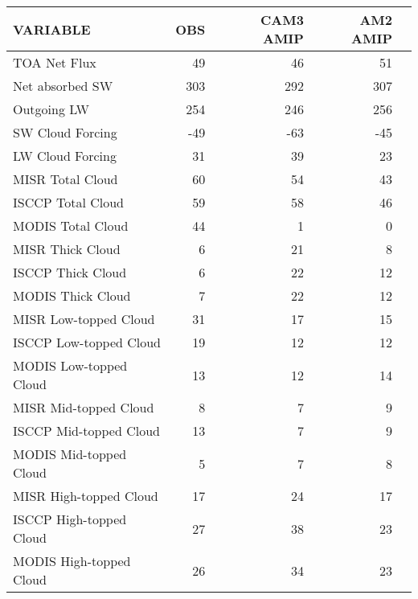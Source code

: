 \begin{tabular}{lrrrr}
\hline
                VARIABLE &                      OBS &                CAM3 AMIP &                 AM2 AMIP \\ \hline
            TOA Net Flux &                       49 &                       46 &                       51 \\
         Net absorbed SW &                      303 &                      292 &                      307 \\
             Outgoing LW &                      254 &                      246 &                      256 \\
        SW Cloud Forcing &                      -49 &                      -63 &                      -45 \\
        LW Cloud Forcing &                       31 &                       39 &                       23 \\
        MISR Total Cloud &                       60 &                       54 &                       43 \\
       ISCCP Total Cloud &                       59 &                       58 &                       46 \\
       MODIS Total Cloud &                       44 &                        1 &                        0 \\
        MISR Thick Cloud &                        6 &                       21 &                        8 \\
       ISCCP Thick Cloud &                        6 &                       22 &                       12 \\
       MODIS Thick Cloud &                        7 &                       22 &                       12 \\
   MISR Low-topped Cloud &                       31 &                       17 &                       15 \\
  ISCCP Low-topped Cloud &                       19 &                       12 &                       12 \\
  MODIS Low-topped Cloud &                       13 &                       12 &                       14 \\
   MISR Mid-topped Cloud &                        8 &                        7 &                        9 \\
  ISCCP Mid-topped Cloud &                       13 &                        7 &                        9 \\
  MODIS Mid-topped Cloud &                        5 &                        7 &                        8 \\
  MISR High-topped Cloud &                       17 &                       24 &                       17 \\
 ISCCP High-topped Cloud &                       27 &                       38 &                       23 \\
 MODIS High-topped Cloud &                       26 &                       34 &                       23 \\ \hline
\end{tabular}
